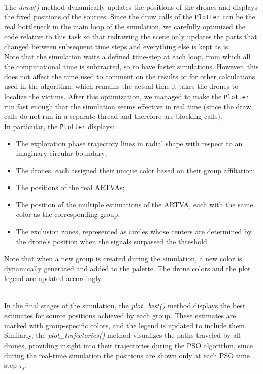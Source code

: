 \documentclass[main]{subfiles}
\begin{document}
\noindent\\
The \textit{draw()} method dynamically updates the positions of the 
drones and displays the fixed positions of the sources.
Since the draw calls of the \texttt{Plotter} can be the real bottleneck in the 
main loop of the simulation, we carefully optimized the code relative 
to this task so that redrawing the scene only updates the parts that 
changed between subsequent time steps and everything else is kept as is.\\
Note that the simulation waits a defined time-step at each loop, 
from which all the computational time is subtracted, so to have faster simulations. 
However, this does not affect the time used to comment on the results or for other 
calculations used in the algorithm, which remains the actual time it takes the 
drones to localize the victims. After this optimization, 
we managed to make the \texttt{Plotter} run fast 
enough that the simulation seems effective in real time (since 
the draw calls do not run in a separate thread and therefore are blocking calls).\\

\noindent
In particular, the \texttt{Plotter} displays:
\begin{itemize}
    \item The exploration phase trajectory lines in radial shape with respect to 
 an imaginary circular boundary; 
    \item The drones, each assigned their unique color based on their group affiliation;
    \item The positions of the real ARTVAs; 
    \item The position of the multiple estimations of the ARTVA, each with 
 the same color as the corresponding group;
    \item The exclusion zones, represented as circles whose centers are determined
 by the drone's position when the signals surpassed the threshold. 
\end{itemize}
Note that when a new group is created during 
the simulation, a new color is dynamically generated and added 
to the palette. The drone colors and the plot legend are updated 
accordingly.

\noindent\\
In the final stages of the simulation, the \textit{plot\_best()} 
method displays the best estimates for source positions achieved 
by each group. These estimates are marked with group-specific colors, 
and the legend is updated to include them. Similarly, 
the \textit{plot\_trajectories()} method visualizes the paths 
traveled by all drones, providing insight into their trajectories
during the PSO algorithm, since during the real-time simulation
the positions are shown only at each PSO time step $\tau_s$.
\end{document}
